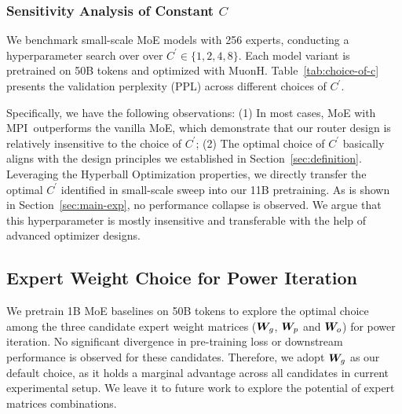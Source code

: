 \documentclass[11pt]{article}
\newcommand{\name}{MPI}
\begin{document}
\subsubsection{Sensitivity Analysis of Constant $C$}
We benchmark small-scale MoE models with 256 experts, conducting a hyperparameter search over over $C^\prime \in \{1,2,4,8\} $.
Each model variant is pretrained on 50B tokens and optimized with MuonH.
Table~\ref{tab:choice-of-c} presents the validation perplexity (PPL) across different choices of $C^\prime$.
\begin{table}[t]
    \centering
    \small
    \caption{Validation perplexity across choices of $C^\prime$.}
    \label{tab:choice-of-c}
\end{table}

Specifically, we have the following observations:
(1) In most cases, MoE with \name\ outperforms the vanilla MoE, which demonstrate that our router design is relatively insensitive to the choice of $C^\prime$; 
(2) The optimal choice of $C^\prime$ basically aligns with the design principles we established in Section~\ref{sec:definition}.
Leveraging the Hyperball Optimization properties, we directly transfer the optimal $C^\prime$ identified in small-scale sweep into our 11B pretraining. 
As is shown in Section~\ref{sec:main-exp}, no performance collapse is observed.
We argue that this hyperparameter is mostly insensitive and transferable with the help of advanced optimizer designs.


\subsection{Expert Weight Choice for Power Iteration}
We pretrain 1B MoE baselines on 50B tokens to explore the optimal choice  among the three candidate expert weight matrices (${\bm{W}}_g$, ${\bm{W}}_p$ and ${\bm{W}}_o$) for power iteration.
No significant divergence in pre-training loss or downstream performance is observed for these candidates.
Therefore, we adopt ${\bm{W}}_g$ as our default choice, as it holds a marginal advantage across all candidates in current experimental setup.
We leave it to future work to explore the potential of expert matrices combinations.
\end{document}
